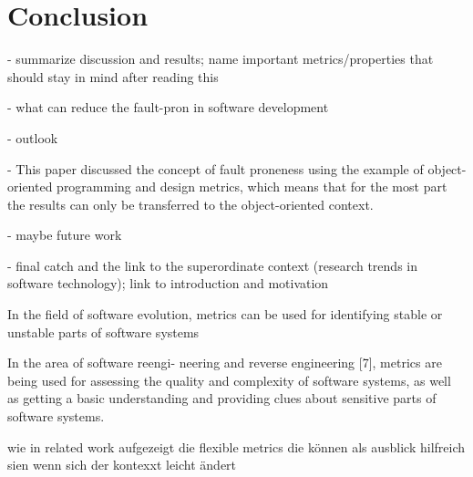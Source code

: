 \section{Conclusion}\label{conclusion}

- summarize discussion and results; name important metrics/properties that should stay in mind after reading this

- what can reduce the fault-pron in software development

- outlook

- This paper discussed the concept of fault proneness using the example of object-oriented programming and design metrics, which means that for the most part the results can only be transferred to the object-oriented context.

- maybe future work

- final catch and the link to the superordinate context (research trends in software technology); link to introduction and motivation

In the field of software evolution, metrics can be used for identifying stable or unstable
parts of software systems

In the area of software reengi-
neering and reverse engineering [7], metrics are being used
for assessing the quality and complexity of software systems,
as well as getting a basic understanding and providing clues
about sensitive parts of software systems.

wie in related work aufgezeigt die flexible metrics die können als ausblick hilfreich sien wenn sich der kontexxt leicht ändert